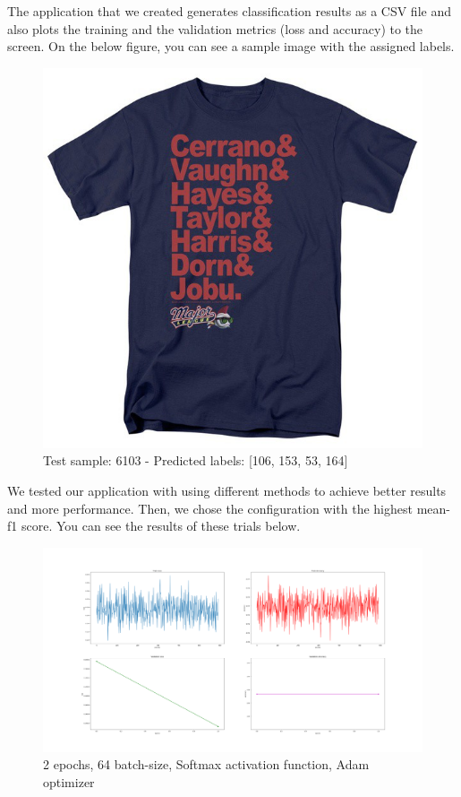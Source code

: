 \documentclass[12pt]{article}
\begin{document}
The application that we created generates classification results as a CSV file and also plots the training and the validation metrics (loss and accuracy) to the screen. On the below figure, you can see a sample image with the assigned labels. \\

\begin{figure}[H]
\centering
\includegraphics[width=1\textwidth]{6103.jpg}
\caption{Test sample: 6103 - Predicted labels: [106, 153, 53, 164]}
\end{figure}

We tested our application with using different methods to achieve better results and more performance. Then, we chose the configuration with the highest mean-f1 score. You can see the results of these trials below.

\begin{figure}[H]
\centering
\includegraphics[width=1\textwidth]{2ep_64btch_softmax.png}
\caption{2 epochs, 64 batch-size, Softmax activation function, Adam optimizer}
\end{figure}
\end{document}

